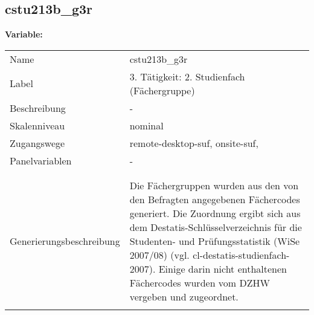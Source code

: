	
	
	\subsection{cstu213b\_g3r}
	\label{subSection:cstu213b_g3r}

	\noindent\textbf{Variable:}\\
		\begin{tabular}{lL{11.3cm}}
			\label{tableVariable:cstu213b_g3r}
			Name & cstu213b\_g3r \\
			Label & 3. Tätigkeit: 2. Studienfach (Fächergruppe) \\
			Beschreibung & - \\
			Skalenniveau & nominal \\
			Zugangswege &
				remote-desktop-suf,
				onsite-suf,
 \\
			Panelvariablen & -
			 \\
			 \\
 \\
					Generierungsbeschreibung & Die Fächergruppen wurden aus den von den Befragten angegebenen Fächercodes generiert. Die Zuordnung ergibt sich aus dem Destatis-Schlüsselverzeichnis für die Studenten- und Prüfungsstatistik (WiSe 2007/08) (vgl. cl-destatis-studienfach-2007).  Einige darin nicht enthaltenen Fächercodes wurden vom DZHW vergeben und zugeordnet. 
				 \\	
			 \\
		\end{tabular}






